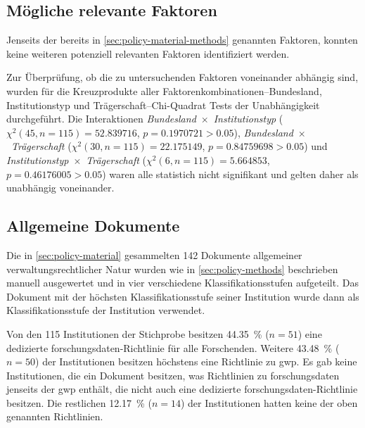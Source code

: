 \subsection{Mögliche relevante Faktoren}
Jenseits der bereits in \cref{sec:policy-material-methods} genannten Faktoren, konnten keine weiteren potenziell relevanten Faktoren identifiziert werden.

Zur Überprüfung, ob die zu untersuchenden Faktoren voneinander abhängig sind, wurden für die Kreuzprodukte aller Faktorenkombinationen--Bundesland, Institutionstyp und Trägerschaft--Chi-Quadrat Tests der Unabhängigkeit durchgeführt.
Die Interaktionen \textit{Bundesland}~$\times$~\textit{Institutionstyp} ($\chi^2 (\num{45}, n=\num{115}) = \num[round-mode=places,round-precision=2]{52,839716}$, $p = \num[round-mode=places,round-precision=2]{0,1970721}>\num{0.05}$), \textit{Bundesland}~$\times$~\textit{Trägerschaft} ($\chi^2 (\num{30}, n=\num{115}) = \num[round-mode=places,round-precision=2]{22,175149}$, $p = \num[round-mode=places,round-precision=2]{0,84759698}>\num{0.05}$) und \textit{Institutionstyp}~$\times$~\textit{Trägerschaft} ($\chi^2 (\num{6}, n=\num{115}) = \num[round-mode=places,round-precision=2]{5,664853}$, $p = \num[round-mode=places,round-precision=2]{0,46176005}>\num{0.05}$) waren alle statistich nicht signifikant und gelten daher als unabhängig voneinander.

\subsection{Allgemeine Dokumente}\label{sec:policy-results-general}
Die in \cref{sec:policy-material} gesammelten \num{142} Dokumente allgemeiner verwaltungsrechtlicher Natur wurden wie in \cref{sec:policy-methods} beschrieben manuell ausgewertet und in vier verschiedene Klassifikationsstufen aufgeteilt.
Das Dokument mit der höchsten Klassifikationsstufe seiner Institution wurde dann als Klassifikationsstufe der Institution verwendet.

Von den \num{115} Institutionen der Stichprobe besitzen \SI{44,35}{\percent} ($n=\num{51}$) eine dedizierte \gls{forschungsdaten}-Richtlinie für alle Forschenden.
Weitere \SI{43,48}{\percent} ($n=\num{50}$) der Institutionen besitzen höchstens eine Richtlinie zu \gls{gwp}.
Es gab keine Institutionen, die ein Dokument besitzen, was Richtlinien zu \gls{forschungsdaten} jenseits der \gls{gwp} enthält, die nicht auch eine dedizierte \gls{forschungsdaten}-Richtlinie besitzen.
Die restlichen \SI{12,17}{\percent} ($n=\num{14}$) der Institutionen hatten keine der oben genannten Richtlinien.

